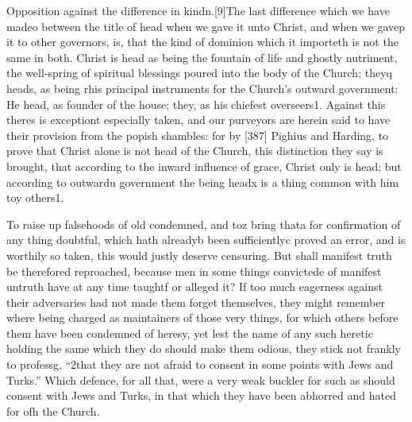 Opposition against the difference in kindn.[9]The last difference which we have madeo between the title of head when we gave it unto Christ, and when we gavep it to other governors, is, that the kind of dominion which it importeth is not the same in both. Christ is head as being the fountain of life and ghostly nutriment, the well-spring of spiritual blessings poured into the body of the Church; theyq heads, as being rhis principal instruments for the Church’s outward government: He head, as founder of the house; they, as his chiefest overseers1. Against this theres is exceptiont especially taken, and our purveyors are herein said to have their provision from the popish shambles: for by [387] Pighius and Harding, to prove that Christ alone is not head of the Church, this distinction they say is brought, that according to the inward influence of grace, Christ only is head; but according to outwardu government the being headx is a thing common with him toy others1.

To raise up falsehoods of old condemned, and toz bring thata for confirmation of any thing doubtful, which hath alreadyb been sufficientlyc proved an error, and is worthily so taken, this would justly deserve censuring. But shall manifest truth be therefored reproached, because men in some things convictede of manifest untruth have at any time taughtf or alleged it? If too much eagerness against their adversaries had not made them forget themselves, they might remember where being charged as maintainers of those very things, for which others before them have been condemned of heresy, yet lest the name of any such heretic holding the same which they do should make them odious, they stick not frankly to professg, “2that they are not afraid to consent in some points with Jews and Turks.” Which defence, for all that, were a very weak buckler for such as should consent with Jews and Turks, in that which they have been abhorred and hated for ofh the Church.

